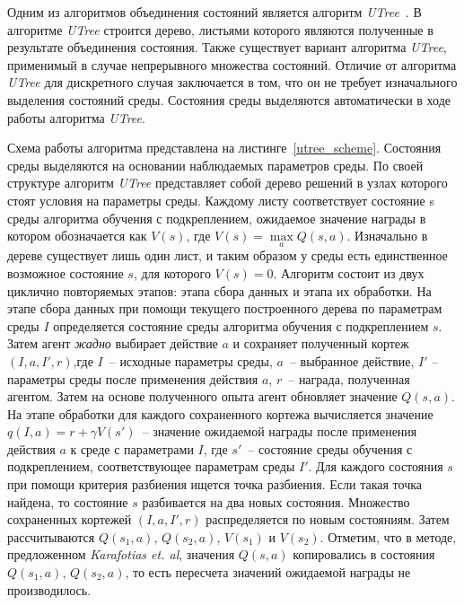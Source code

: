 Одним из алгоритмов объединения состояний является алгоритм \textit{UTree}~\cite{utree}. В алгоритме \textit{UTree} строится дерево, листьями которого являются полученные в результате объединения состояния. Также существует вариант алгоритма \textit{UTree}, применимый в случае непрерывного множества состояний. Отличие от алгоритма \textit{UTree} для дискретного случая заключается в том, что он не требует изначального выделения состояний среды. Состояния среды выделяются автоматически в ходе работы алгоритма \textit{UTree}.

Схема работы алгоритма представлена на листинге~\ref{utree_scheme}. Состояния среды выделяются на основании наблюдаемых параметров среды. По своей структуре алгоритм \textit{UTree} представляет собой дерево решений в узлах которого стоят условия на параметры среды. Каждому листу соответствует состояние s среды алгоритма обучения с подкреплением, ожидаемое значение награды в котором обозначается как $V(s)$, где $V(s) = \max \limits_a Q(s,a)$. Изначально в дереве существует лишь один лист, и таким образом у среды есть единственное возможное состояние $s$, для которого $V(s) = 0$. Алгоритм состоит из двух циклично повторяемых этапов: этапа сбора данных и этапа их обработки. На этапе сбора данных при помощи текущего построенного дерева по параметрам среды $I$ определяется состояние среды алгоритма обучения с подкреплением $s$. Затем агент \textit{жадно} выбирает действие $a$ и сохраняет полученный кортеж $(I, a, I', r)$,где $I$~-- исходные параметры среды, $a$~-- выбранное действие, $I'$ -- параметры среды после применения действия $a$, $r$~-- награда, полученная агентом. Затем на основе полученного опыта агент обновляет значение $Q(s, a)$. На этапе обработки для каждого сохраненного кортежа вычисляется значение $q(I, a) =  r + \gamma V (s')$~-- значение ожидаемой награды после применения действия $a$ к среде с параметрами $I$, где $s'$~-- состояние среды обучения с подкреплением, соответствующее параметрам среды $I'$. Для каждого состояния $s$ при помощи критерия разбиения ищется точка разбиения. Если такая точка найдена, то состояние $s$ разбивается на два новых состояния. Множество сохраненных кортежей $(I, a, I', r)$ распределяется по новым состояниям. Затем рассчитываются $Q(s_1, a)$, $Q(s_2, a)$, $V(s_1)$ и $V(s_2)$. Отметим, что в методе, предложенном \textit{Karafotias et. al}, значения $Q(s, a)$ копировались в состояния $Q(s_1, a)$, $Q(s_2, a)$, то есть пересчета значений ожидаемой награды не производилось.

